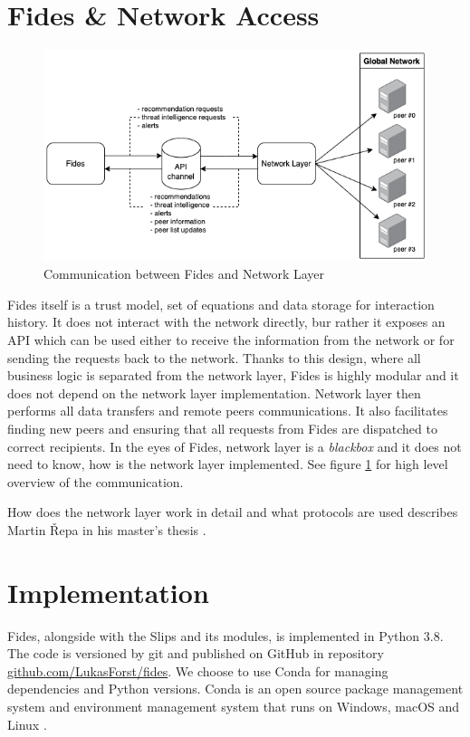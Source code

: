 \section{Fides \& Network Access}
\label{sec:fides-and-network-access}

\begin{figure}[ht]
    \centering
    \includegraphics[width=1.0\textwidth]{assets/tl_api_nl.png}
    \caption{Communication between Fides and Network Layer}
    \label{fig:fides-api-network}
\end{figure}

Fides itself is a trust model, set of equations and data storage for interaction history. 
It does not interact with the network directly, bur rather it exposes an API which can be used either to receive the information from the network or for sending the requests back to the network.
Thanks to this design, where all business logic is separated from the network layer, Fides is highly modular and it does not depend on the network layer implementation.
Network layer then performs all data transfers and remote peers communications.
It also facilitates finding new peers and ensuring that all requests from Fides are dispatched to correct recipients.
In the eyes of Fides, network layer is a \textit{blackbox} and it does not need to know, how is the network layer implemented.
See figure \ref{fig:fides-api-network} for high level overview of the communication.

How does the network layer work in detail and what protocols are used describes Martin Řepa in his master's thesis \cite{nl}.

\section{Implementation}
\label{sec:implementation}
Fides, alongside with the Slips and its modules, is implemented in Python 3.8.
The code is versioned by git and published on GitHub in repository \href{https://github.com/LukasForst/fides}{github.com/LukasForst/fides}.
We choose to use Conda for managing dependencies and Python versions. 
Conda is an open source package management system and environment management system that runs on Windows, macOS and Linux \cite{conda}.